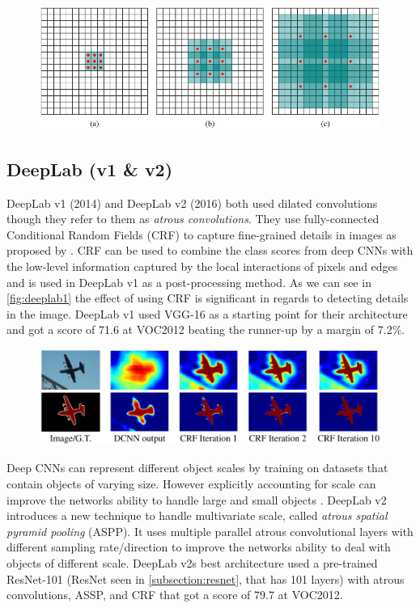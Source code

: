 \begin{figure}[H]
	\centering
	\includegraphics[width=0.7\linewidth]{fig/dilution.png}
	\label{fig:dilution}
\end{figure}


\subsection{DeepLab (v1 \& v2)}
DeepLab v1 (2014) \cite{Chen2014} and DeepLab v2 (2016) \cite{Chen2016} both used dilated convolutions though they refer to them as \emph{atrous convolutions}. They use fully-connected Conditional Random Fields (CRF) to capture fine-grained details in images as proposed by \citeauthor{Krahenbuhl2012a} \cite{Krahenbuhl2012a}. CRF can be used to combine the class scores from deep CNNs with the low-level information captured by the local interactions of pixels and edges \cite{Chen2014} and is used in DeepLab v1 as a post-processing method. As we can see in \autoref{fig:deeplab1} the effect of using CRF is significant in regards to detecting details in the image. DeepLab v1 used VGG-16 as a starting point for their architecture and got a score of 71.6 at VOC2012 beating the runner-up by a margin of 7.2\%. 

\begin{figure}[H]
	\centering
	\includegraphics[width=0.7\linewidth]{fig/deeplab1.png}
	\label{fig:deeplab1}
\end{figure}


Deep CNNs can represent different object scales by training on datasets that contain objects of varying size. However explicitly accounting for scale can improve the networks ability to handle large and small objects \cite{Papandreou2015}. DeepLab v2 introduces a new technique to handle multivariate scale, called \emph{atrous spatial pyramid pooling} (ASPP). It uses multiple parallel atrous convolutional layers with different sampling rate/direction to improve the networks ability to deal with objects of different scale. DeepLab v2s best architecture used a pre-trained ResNet-101 (ResNet seen in \autoref{subsection:resnet}, that has 101 layers) with atrous convolutions, ASSP, and CRF that got a score of 79.7 at VOC2012.


